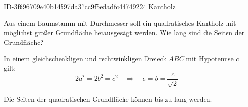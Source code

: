 \begin{exercise}
      {ID-3f696709e40b14597da37cc9f5edadfc44749224}
      {Kantholz}
  \ifproblem\problem\par
    Aus einem Baumstamm mit  Durchmesser soll ein quadratisches Kantholz
    mit möglichst großer Grundfläche herausgesägt werden. Wie lang sind die
    Seiten der Grundfläche?
  \fi
  \ifoutline\outline\par
    In einem gleichschenkligen und rechtwinkligen Dreieck $ABC$ mit
    Hypotenuse $c$ gilt:
    \begin{equation*}
      2a^2=2b^2=c^2
      \quad\Rightarrow\quad
      a=b=\frac{c}{\sqrt{2}}
    \end{equation*}
  \fi
  \ifoutcome\outcome\par
    Die Seiten der quadratischen Grundfläche können bis zu
     lang werden.
  \fi
\end{exercise}
